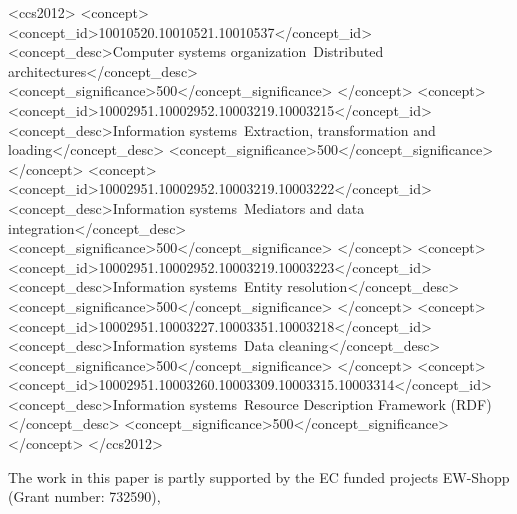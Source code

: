\documentclass[sigconf, final]{acmart}
\begin{document}
%
%
\begin{CCSXML}
<ccs2012>
  <concept>
    <concept_id>10010520.10010521.10010537</concept_id>
    <concept_desc>Computer systems organization~Distributed architectures</concept_desc>
    <concept_significance>500</concept_significance>
  </concept>
  <concept>
    <concept_id>10002951.10002952.10003219.10003215</concept_id>
    <concept_desc>Information systems~Extraction, transformation and loading</concept_desc>
    <concept_significance>500</concept_significance>
  </concept>
  <concept>
    <concept_id>10002951.10002952.10003219.10003222</concept_id>
    <concept_desc>Information systems~Mediators and data integration</concept_desc>
    <concept_significance>500</concept_significance>
  </concept>
  <concept>
    <concept_id>10002951.10002952.10003219.10003223</concept_id>
    <concept_desc>Information systems~Entity resolution</concept_desc>
    <concept_significance>500</concept_significance>
  </concept>
  <concept>
    <concept_id>10002951.10003227.10003351.10003218</concept_id>
    <concept_desc>Information systems~Data cleaning</concept_desc>
    <concept_significance>500</concept_significance>
  </concept>
  <concept>
    <concept_id>10002951.10003260.10003309.10003315.10003314</concept_id>
    <concept_desc>Information systems~Resource Description Framework (RDF)</concept_desc>
    <concept_significance>500</concept_significance>
  </concept>
</ccs2012>
\end{CCSXML}





\maketitle





%


\begin{acks}
The work in this paper is partly supported by the EC funded projects EW-Shopp (Grant number: 732590), 
\end{acks}




\end{document}
